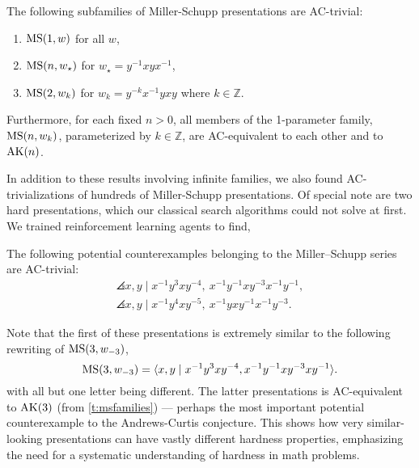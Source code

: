 \begin{theorem}\label{t:msfamilies}
        The following subfamilies of Miller-Schupp presentations are AC-trivial:
        \begin{enumerate}[label=(\roman*)]
            \item $\text{MS}(1, w)$ for all $w$,
            \item $\text{MS}(n, w_\star)$ for $w_\star = y^{-1} x y x^{-1}$,
            \item $\text{MS}(2, w_k)$ for $w_k = y^{-k} x^{-1} y x y$ where $k \in \mathbb{Z}$.
        \end{enumerate}
        Furthermore, for each fixed $n > 0$, all members of the 1-parameter family, $\text{MS}(n, w_k)$, parameterized by $k \in \mathbb{Z}$, are AC-equivalent to each other and to $\text{AK}(n)$.
\end{theorem}

In addition to these results involving infinite families, we also found AC-trivializations of hundreds of Miller-Schupp presentations. Of special note are two hard presentations,
which our classical search algorithms could not solve at first. We trained reinforcement learning agents to find,

\begin{theorem}\label{thm:MS}
    The following potential counterexamples belonging to the Miller--Schupp series are AC-trivial:
	\begin{gather*}
		\angles{x, y \mid x^{-1} y^3 x y^{-4} , \ x^{-1} y^{-1} x y^{-3} x^{-1} y^{-1}}, \\
		\angles{x, y \mid x^{-1} y^4 x y^{-5} , \ x^{-1} y x y^{-1} x^{-1} y^{-3}}.
	\end{gather*}
\end{theorem}

Note that the first of these presentations is extremely similar to the following rewriting of $\text{MS}(3, w_{-3})$,
\[
\text{MS}(3, w_{-3}) = \langle x, y \mid x^{-1} y^3 x y^{-4}, x^{-1} y^{-1} x y^{-3} x y^{-1}\rangle.
\]
with all but one letter being different. The latter presentations is AC-equivalent to $\text{AK}(3)$ (from \cref{t:msfamilies}) --- perhaps the most important potential counterexample to the Andrews-Curtis conjecture.
This shows how very similar-looking presentations can have vastly different hardness properties, emphasizing the need for a systematic understanding of hardness in math problems.

